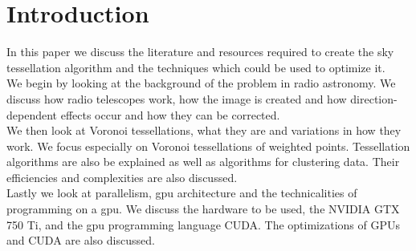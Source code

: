 \section{Introduction}\label{int}
In this paper we discuss the literature and resources required to create the sky tessellation algorithm and the techniques which could be used to optimize it.
\\
We begin by looking at the background of the problem in radio astronomy. We discuss how radio telescopes work, how the image is created and how direction-dependent effects occur and how they can be corrected.
\\
We then look at Voronoi tessellations, what they are and variations in how they work. We focus especially on Voronoi tessellations of weighted points. Tessellation algorithms are also be explained as well as algorithms for clustering data. Their efficiencies and complexities are also discussed.
\\
Lastly we look at parallelism, \gls{gpu} architecture and the technicalities of programming on a \gls{gpu}. We discuss the hardware to be used, the NVIDIA GTX 750 Ti, and the \gls{gpu} programming language CUDA. The optimizations of GPUs and CUDA are also discussed.
